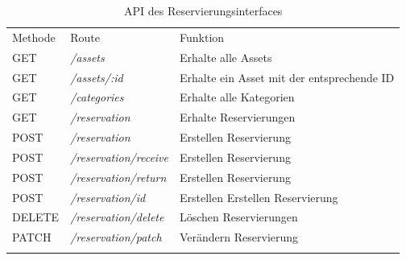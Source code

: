 \begin{table}[h]
  \centering
  \caption{API des Reservierungsinterfaces}
  \begin{tabular}{lll}
    \arrayrulecolor{maincolor}\hline
    \sffamily\color{maincolor}Methode & \sffamily\color{maincolor}Route &
    \sffamily\color{maincolor}Funktion                                                              \\
    \arrayrulecolor{maincolor}\hline
    GET                               & \textit{/assets}                & Erhalte alle Assets       \\
    GET                               & \textit{/assets/:id}            & Erhalte ein Asset mit der
    entsprechende ID                                                                                \\
    GET                               & \textit{/categories}            & Erhalte alle Kategorien   \\
    GET                               & \textit{/reservation}           & Erhalte Reservierungen    \\
    POST                              & \textit{/reservation}           & Erstellen Reservierung    \\
    POST                              & \textit{/reservation/receive}   & Erstellen Reservierung    \\
    POST                              & \textit{/reservation/return}    & Erstellen Reservierung    \\
    POST                              & \textit{/reservation/id}        & Erstellen Erstellen
    Reservierung                                                                                    \\
    DELETE                            & \textit{/reservation/delete}    & Löschen Reservierungen    \\
    PATCH                             & \textit{/reservation/patch}     & Verändern Reservierung    \\
    \arrayrulecolor{maincolor}\hline
  \end{tabular}
  \label{table:impl-backend-routes}
\end{table}

